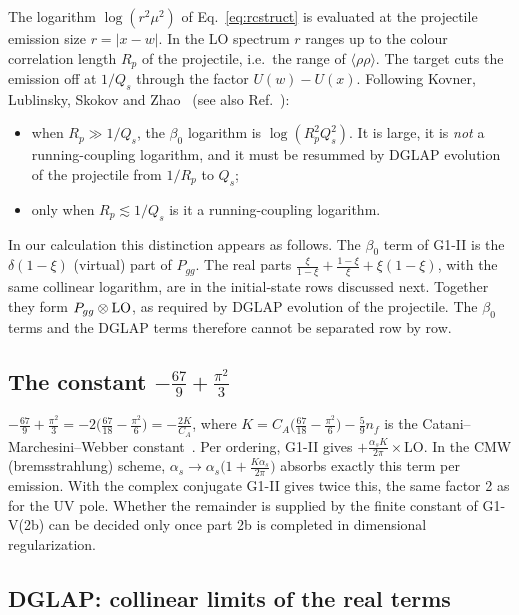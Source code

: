 The logarithm $\log(r^2\mu^2)$ of Eq.~\eqref{eq:rcstruct} is evaluated at the projectile emission size $r=|x-w|$. In the LO spectrum $r$ ranges up to the colour correlation length $R_p$ of the projectile, i.e.\ the range of $\langle\rho\rho\rangle$. The target cuts the emission off at $1/Q_s$ through the factor $U(w)-U(x)$. Following Kovner, Lublinsky, Skokov and Zhao~\cite{Kovner:2023vsy} (see also Ref.~\cite{Altinoluk:2023hfz}):
\begin{itemize}
\item when $R_p\gg1/Q_s$, the $\beta_0$ logarithm is $\log(R_p^2Q_s^2)$. It is large, it is \emph{not} a running-coupling logarithm, and it must be resummed by DGLAP evolution of the projectile from $1/R_p$ to $Q_s$;
\item only when $R_p\lesssim1/Q_s$ is it a running-coupling logarithm.
\end{itemize}
In our calculation this distinction appears as follows. The $\beta_0$ term of G1-II is the $\delta(1-\xi)$ (virtual) part of $P_{gg}$. The real parts $\frac{\xi}{1-\xi}+\frac{1-\xi}{\xi}+\xi(1-\xi)$, with the same collinear logarithm, are in the initial-state rows discussed next. Together they form $P_{gg}\otimes{\rm LO}$, as required by DGLAP evolution of the projectile. The $\beta_0$ terms and the DGLAP terms therefore cannot be separated row by row.

\subsection{The constant \texorpdfstring{$-\frac{67}{9}+\frac{\pi^2}{3}$}{-67/9+pi2/3}}\label{sec:CMW}

$-\frac{67}{9}+\frac{\pi^2}{3}=-2\big(\frac{67}{18}-\frac{\pi^2}{6}\big)=-\frac{2K}{C_A}$, where $K=C_A\big(\frac{67}{18}-\frac{\pi^2}{6}\big)-\frac59n_f$ is the Catani--Marchesini--Webber constant~\cite{Catani:1990rr}. Per ordering, G1-II gives $+\frac{\alpha_sK}{2\pi}\times$LO. In the CMW (bremsstrahlung) scheme, $\alpha_s\to\alpha_s\big(1+\frac{K\alpha_s}{2\pi}\big)$ absorbs exactly this term per emission. With the complex conjugate G1-II gives twice this, the same factor 2 as for the UV pole. Whether the remainder is supplied by the finite constant of G1-V(2b) can be decided only once part 2b is completed in dimensional regularization.

\subsection{DGLAP: collinear limits of the real terms}\label{sec:dglap}

